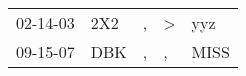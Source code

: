 \begin{supertabular}{p{0.07\textwidth}p{0.06\textwidth}p{0.02\textwidth}p{0.02\textwidth}p{0.06\textwidth}}
 02-14-03\textsuperscript{} &  2X2\textsuperscript{} &  , &  \textgreater &   yyz\textsuperscript{} \\
 09-15-07\textsuperscript{} &  DBK\textsuperscript{} &  , &             , &  MISS\textsuperscript{} \\
\end{supertabular}
